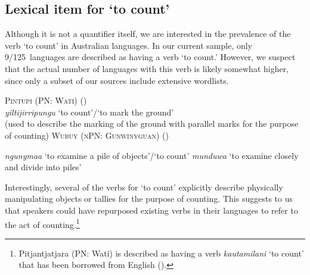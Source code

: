 \documentclass[12pt,egregdoesnotlikesansseriftitles]{scrartcl}
\newcommand{\ofy}{/125} %
\begin{document}




\subsection{Lexical item for `to count'}


Although it is not a quantifier itself, we are interested in the prevalence of the verb `to count' in Australian languages. In our current sample, only 9\ofy \ languages are described as having a verb `to count.' However, we suspect that the actual number of languages with this verb is likely somewhat higher, since only a subset of our sources include extensive wordlists.


\begin{exe}
  \ex \textsc{Pintupi (PN: Wati)} \hfill (\citealt[179]{pintupi77})\\
  \textit{yiltijirripungu} `to count'/`to mark the ground'\\
  (used to describe the marking of the ground with parallel marks for the purpose of counting)
  \ex \textsc{Wubuy (nPN: Gunwinyguan)} \hfill (\citealt{nuydict})
  \begin{xlist}
     \ex \textit{ngunymaa} `to examine a pile of objects'/`to count'
    \ex \textit{munduwa} `to examine closely and divide into piles' 
  \end{xlist}
\end{exe} 

Interestingly, several of the verbs for `to count' explicitly describe physically manipulating objects or tallies for the purpose of counting. This suggests to us that speakers could have repurposed existing verbs in their languages to refer to the act of counting.\footnote{Pitjantjatjara (PN: Wati) is described as having a verb \textit{kautamilani} `to count' that has been borrowed from English (\citealt[36]{goddard92}).}
\end{document}
